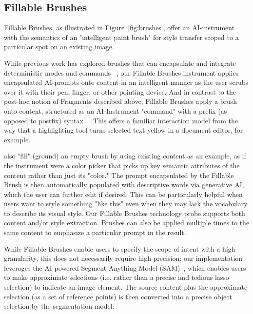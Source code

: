 \subsection{Fillable Brushes}



Fillable Brushes, as illustrated in Figure~\ref{fig:brushes}, 
offer an AI-instrument with the semantics of an "intelligent paint brush" for style transfer scoped to a particular spot on an existing image. 

While previous work has explored brushes that can encapsulate and integrate deterministic modes and commands ~\cite{romat2022style}, our Fillable Brushes instrument applies encapsulated AI-prompts onto content in an intelligent manner as the user scrubs over it with their pen, finger, or other pointing device. And in contrast to the post-hoc notion of Fragments described above, Fillable Brushes apply a brush onto content, structured as an AI-Instrument "command" with a prefix (as opposed to postfix) syntax ~\cite{LexicalPragmaticInput1983}. This offers a familiar interaction model from the way that a highlighting tool turns selected text yellow in a document editor, for example. 



 also "fill" (ground) an empty brush by using existing content as an example, as if the instrument were a color picker that picks up key semantic attributes of the content rather than just its "color." The prompt encapsulated by the Fillable Brush is then automatically populated with descriptive words via generative AI, which the user can further edit if desired. This can be particularly helpful when users want to style something "like this" even when they may lack the vocabulary to describe its visual style. Our Fillable Brushes technology probe supports both content and/or style extraction.  Brushes can also be applied multiple times to the same content to emphasize a particular prompt in the result. 

While Fillable Brushes enable users to specify the scope of intent with a high granularity, this does not necessarily require high precision: our implementation leverages the AI-powered Segment Anything Model (SAM)~\cite{kirillov_segment_2023}, which enables users to make approximate selections (i.e. rather than a precise and tedious lasso selection) to indicate an image element. The source content plus the approximate selection (as a set of reference points) is then converted into a precise object selection by the segmentation model. 




